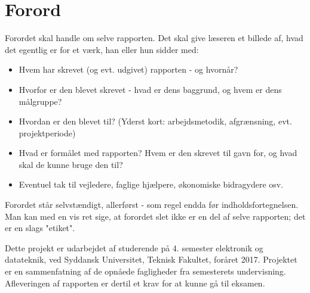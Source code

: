 \chapter*{Forord}\label{chap:forord}




Forordet skal handle om selve rapporten. Det skal give læseren et billede af, hvad det egentlig er for et værk, han eller hun sidder med:

\begin{itemize}
	\item Hvem har skrevet (og evt. udgivet) rapporten - og hvornår?
	\item Hvorfor er den blevet skrevet - hvad er dens baggrund, og hvem er dens målgruppe?
	\item Hvordan er den blevet til? (Yderst kort: arbejdsmetodik, afgrænsning, evt. projektperiode)
	\item Hvad er formålet med rapporten? Hvem er den skrevet til gavn for, og hvad skal de kunne bruge den til?
	\item Eventuel tak til vejledere, faglige hjælpere, økonomiske bidragydere osv.
\end{itemize}

Forordet står selvstændigt, allerførst - som regel endda før indholdsfortegnelsen. Man kan med en vis ret sige, at forordet slet ikke er en del af selve rapporten; det er en slags "etiket".

Dette projekt er udarbejdet af studerende på 4. semester elektronik og datateknik, ved Syddansk Universitet, Teknisk Fakultet, foråret 2017. Projektet er en sammenfatning af de opnåede fagligheder fra semesterets undervisning. Afleveringen af rapporten er dertil et krav for at kunne gå til eksamen.


